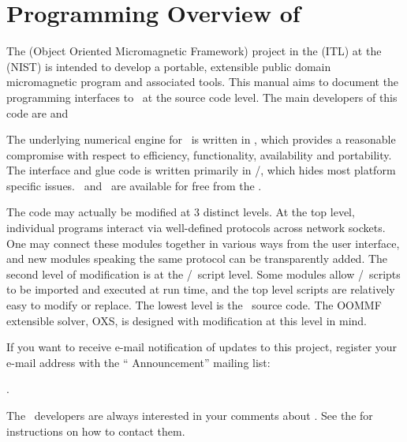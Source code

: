 \chapter{Programming Overview of \OOMMF}\label{sec:overview}
The
 (Object
Oriented Micromagnetic Framework) project in the
(ITL) at the
 (NIST) is intended to develop a
portable, extensible public domain micromagnetic program and associated
tools.  This manual aims to document the programming interfaces to
\OOMMF\ at the source code level.  The main developers of this code are
and

The underlying numerical engine for \OOMMF\ is written in \Cplusplus,
which provides a reasonable compromise with respect to efficiency,
functionality, availability and portability.  The interface and glue
code is written primarily in \Tcl/\Tk, which hides most platform
specific issues. \Tcl\ and \Tk\ are available for free
from the
.

The code may actually be modified at 3 distinct levels.  At the top
level, individual programs interact via well-defined protocols across
network sockets.  One may connect these modules
together in various ways from the user interface, and new modules
speaking the same protocol can be transparently added.  The second level
of modification is at the \Tcl/\Tk\ script level.  Some modules allow
\Tcl/\Tk\ scripts to be imported and executed at run time, and the top
level scripts are relatively easy to modify or replace.  The lowest
level is the \Cplusplus\ source code.  The OOMMF extensible solver, OXS,
is designed with modification at this level in mind.

If you want to receive e-mail
notification of updates to this project, register
your e-mail address with the ``{\mumag} Announcement'' mailing list:
\begin{center}
.
\end{center}

The \OOMMF\ developers are always interested in your comments about
\OOMMF.  See the 
for instructions on how to contact them.

